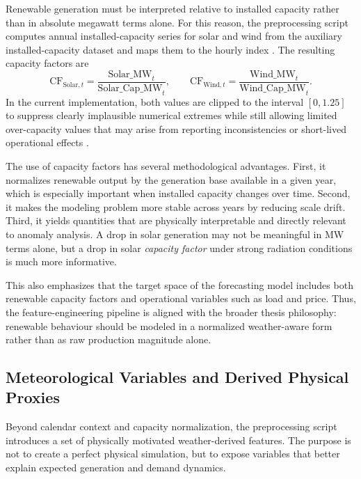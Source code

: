Renewable generation must be interpreted relative to installed capacity rather than in absolute megawatt terms alone. For this reason, the preprocessing script computes annual installed-capacity series for solar and wind from the auxiliary installed-capacity dataset and maps them to the hourly index \cite{repo_thesis_grid_anomaly}. The resulting capacity factors are
\begin{equation}
	\mathrm{CF}_{\mathrm{Solar},t} =
	\frac{\mathrm{Solar\_MW}_t}{\mathrm{Solar\_Cap\_MW}_t},
	\qquad
	\mathrm{CF}_{\mathrm{Wind},t} =
	\frac{\mathrm{Wind\_MW}_t}{\mathrm{Wind\_Cap\_MW}_t}.
	\label{eq:capacity_factors}
\end{equation}
In the current implementation, both values are clipped to the interval $[0, 1.25]$ to suppress clearly implausible numerical extremes while still allowing limited over-capacity values that may arise from reporting inconsistencies or short-lived operational effects \cite{repo_thesis_grid_anomaly}.

The use of capacity factors has several methodological advantages. First, it normalizes renewable output by the generation base available in a given year, which is especially important when installed capacity changes over time. Second, it makes the modeling problem more stable across years by reducing scale drift. Third, it yields quantities that are physically interpretable and directly relevant to anomaly analysis. A drop in solar generation may not be meaningful in MW terms alone, but a drop in solar \emph{capacity factor} under strong radiation conditions is much more informative.

This also emphasizes that the target space of the forecasting model includes both renewable capacity factors and operational variables such as load and price. Thus, the feature-engineering pipeline is aligned with the broader thesis philosophy: renewable behaviour should be modeled in a normalized weather-aware form rather than as raw production magnitude alone.

\subsection{Meteorological Variables and Derived Physical Proxies}

Beyond calendar context and capacity normalization, the preprocessing script introduces a set of physically motivated weather-derived features. The purpose is not to create a perfect physical simulation, but to expose variables that better explain expected generation and demand dynamics.


